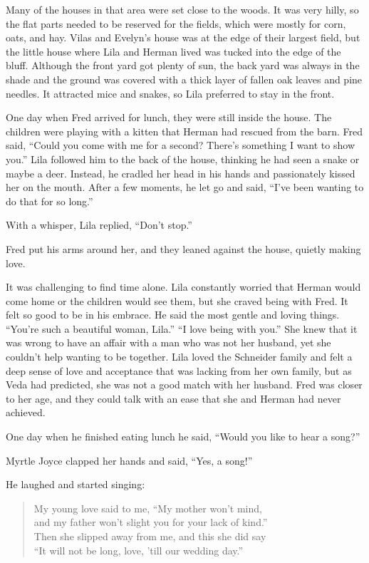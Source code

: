 \documentclass[
  american,
  letterpaper,
]{book}
\begin{document}
Many of the houses in that area were set close to the woods. It was very
hilly, so the flat parts needed to be reserved for the fields, which
were mostly for corn, oats, and hay. Vilas and Evelyn's house was at the
edge of their largest field, but the little house where Lila and Herman
lived was tucked into the edge of the bluff. Although the front yard got
plenty of sun, the back yard was always in the shade and the ground was
covered with a thick layer of fallen oak leaves and pine needles. It
attracted mice and snakes, so Lila preferred to stay in the front.

One day when Fred arrived for lunch, they were still inside the house.
The children were playing with a kitten that Herman had rescued from the
barn. Fred said, ``Could you come with me for a second? There's
something I want to show you.'' Lila followed him to the back of the
house, thinking he had seen a snake or maybe a deer. Instead, he cradled
her head in his hands and passionately kissed her on the mouth. After a
few moments, he let go and said, ``I've been wanting to do that for so
long.''

With a whisper, Lila replied, ``Don't stop.''

Fred put his arms around her, and they leaned against the house, quietly
making love.

It was challenging to find time alone. Lila constantly worried that
Herman would come home or the children would see them, but she craved
being with Fred. It felt so good to be in his embrace. He said the most
gentle and loving things. ``You're such a beautiful woman, Lila.'' ``I
love being with you.'' She knew that it was wrong to have an affair with
a man who was not her husband, yet she couldn't help wanting to be
together. Lila loved the Schneider family and felt a deep sense of love
and acceptance that was lacking from her own family, but as Veda had
predicted, she was not a good match with her husband. Fred was closer to
her age, and they could talk with an ease that she and Herman had never
achieved.

One day when he finished eating lunch he said, ``Would you like to hear
a song?''

Myrtle Joyce clapped her hands and said, ``Yes, a song!''

He laughed and started singing:

\begin{quote}
My young love said to me, ``My mother won't mind,\\
and my father won't slight you for your lack of kind.''\\
Then she slipped away from me, and this she did say\\
``It will not be long, love, 'till our wedding day.''
\end{quote}
\end{document}
